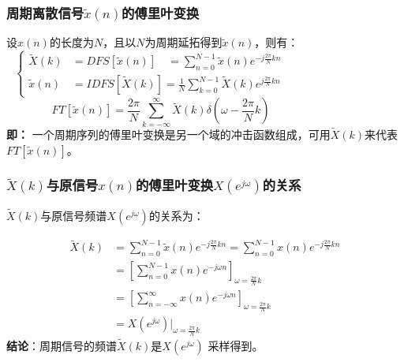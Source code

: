 \documentclass[notheorems,compress,mathserif,table]{beamer}
\begin{document}
\begin{frame}[shrink]\frametitle{周期离散信号$\tilde{x}(n)$的傅里叶变换}%
        设$x(n)$的长度为$N$，且以$N$为周期延拓得到$\tilde{x}(n)$，则有：
        \begin{equation}
           \left\{ \begin{aligned}
               \tilde{X}(k) &= DFS[\tilde{x}(n)]\quad  = \sum_{n=0}^{N-1}\tilde{x}(n)e^{-j\frac{2\pi}{N}kn}
                              \quad\quad\quad\quad\quad\quad\quad\quad\quad\quad \\
               \tilde{x}(n) &= IDFS[\tilde{X}(k)]
                               = \frac{1}{N}\sum_{k=0}^{N-1}\tilde{X}(k)e^{j\frac{2\pi}{N}kn}
           \end{aligned} \right.
        \end{equation}
        $$FT[\tilde{x}(n)] =  \frac{2\pi}{N}\sum_{k=-\infty}^{\infty}\tilde{X}(k)\delta(\omega-\frac{2\pi}{N}k) \qquad\qquad\qquad\qquad$$
        \textbf{即：} 一个周期序列的傅里叶变换是另一个域的冲击函数组成，可用$\tilde{X}(k)$来代表$FT[\tilde{x}(n)]$。\par
\end{frame}





\begin{frame}[shrink]\frametitle{ $\tilde{X}(k)$与原信号$ x(n) $的傅里叶变换$X(e^{j\omega})$的关系}%
        $\tilde{X}(k)$与原信号频谱$X(e^{j\omega})$的关系为：

        \begin{equation}
        \begin{split}
        \tilde{X}(k) &= \sum_{n=0}^{N-1}\tilde{x}(n)e^{-j\frac{2\pi}{N}kn}= \sum_{n=0}^{N-1}x(n)e^{-j\frac{2\pi}{N}kn}\\
                     &= \left[\sum_{n=0}^{N-1}x(n)e^{-j\omega n}\right]_{\omega =\frac{2\pi}{N}k}\\
                     &= \left[\sum_{n=-\infty}^{\infty}x(n)e^{-j\omega n}\right]_{\omega =\frac{2\pi}{N}k}\\
                     &= X(e^{j\omega})\Big|_{\omega =\frac{2\pi}{N}k}
        \end{split}
        \end{equation}
        \textbf{结论}：周期信号的频谱$ \tilde{X}(k) $是$X(e^{j\omega})$ 采样得到。
\end{frame}        
\end{document}
